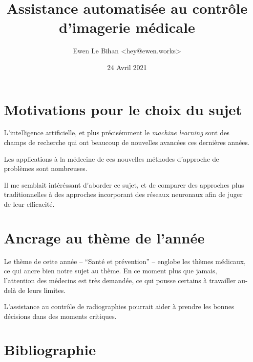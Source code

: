 \documentclass{article}
\title{Assistance automatisée au contrôle d'imagerie médicale}
\author{Ewen Le Bihan \textless hey@ewen.works\textgreater}
\date{24 Avril 2021}
\begin{document}
\maketitle

\section{Motivations pour le choix du sujet}

L'intelligence artificielle, et plus précisémment le \emph{machine learning} sont des champs de recherche
qui ont beaucoup de nouvelles avancées ces dernières années.

Les applications à la médecine de ces nouvelles méthodes d'approche de problèmes sont nombreuses.

Il me semblait intéréssant d'aborder ce sujet, et de comparer des approches plus traditionnelles à des approches
incorporant des réseaux neuronaux afin de juger de leur efficacité.

\section{Ancrage au thème de l'année}

Le thème de cette année -- ``Santé et prévention'' -- englobe les thèmes médicaux, ce qui ancre bien notre sujet
au thème. En ce moment plus que jamais, l'attention des médecins est très demandée, ce qui pousse certains à travailler au-delà de leurs limites.

L'assistance au contrôle de radiographies pourrait aider à prendre les bonnes décisions dans des moments critiques.

\section{Bibliographie}
\end{document}
